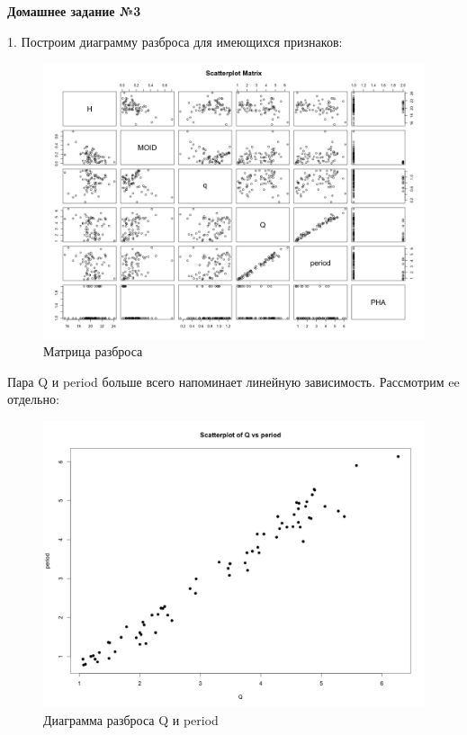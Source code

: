 \documentclass{article}
\begin{document}
$$$$

\large \textbf{Домашнее задание №3}

1. Построим диаграмму разброса для имеющихся признаков:

\begin{figure}[H] 
\centering
\includegraphics[scale=0.5]{img/3_paired_scatter.png}
\caption{Матрица разброса}
\label{fig :metka1}
\end{figure}

Пара Q и period больше всего напоминает линейную зависимость. Рассмотрим ee отдельно:  

\begin{figure}[H] 
\centering
\includegraphics[scale=0.4]{img/3_Q_vs_period.png}
\caption{Диаграмма разброса Q и period}
\label{fig :metka1}
\end{figure}
\end{document}
